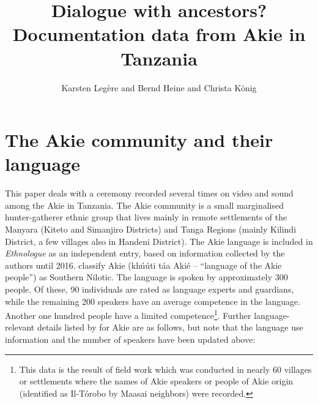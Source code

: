 \documentclass[output=paper,colorlinks,citecolor=brown]{langscibook}
\author{Karsten Legère\affiliation{University of Gothenburg} and Bernd Heine\affiliation{University of Cologne} and  Christa König\affiliation{Goethe University Frankfurt}}
\title{Dialogue with ancestors? Documentation data from Akie in Tanzania}
\begin{document}
\maketitle

\section{The Akie community and their language}\label{sec:legere:1}

This paper deals with a ceremony recorded several times on video and sound among the Akie in Tanzania. The Akie community is a small marginalised hunter-gatherer ethnic group that lives mainly in remote settlements of the Manyara (Kiteto and Simanjiro Districts) and Tanga Regions (mainly Kilindi District, a few villages also in Handeni District). The Akie language is included in \textit{Ethnologue} \citep{SimonsFennig2018}  as an independent entry, based on information collected by the authors until 2016. \citeauthor{SimonsFennig2018} classify Akie (khúúti táa Akié – “language of the Akie people”) as Southern Nilotic. The language is spoken by approximately 300 people. Of these, 90 individuals are rated as language experts and guardians, while the remaining 200 speakers have an average competence in the language. Another one hundred people have a limited competence\footnote{This data is the result of field work which was conducted  in nearly 60 villages or settlements where the names of Akie speakers or people of Akie origin (identified as Il-Tórobo by Maasai neighbors) were recorded.}. Further language-relevant details listed by \citeauthor{SimonsFennig2018} for Akie are as follows, but note that the language use information and the number of speakers have been updated above:
\end{document}
